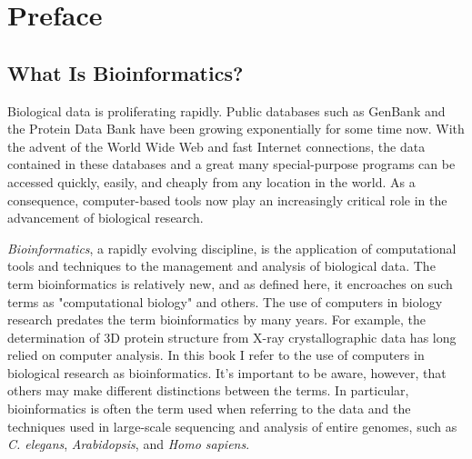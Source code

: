 \chapter*{Preface}
\minitoc %

\section*{What Is Bioinformatics?}
Biological data is proliferating rapidly. Public databases such as GenBank and the Protein Data Bank have been growing exponentially for some time now. With the advent of the World Wide Web and fast Internet connections, the data contained in these databases and a great many special-purpose programs can be accessed quickly, easily, and cheaply from any location in the world. As a consequence, computer-based tools now play an increasingly critical role in the advancement of biological research.

\textit{Bioinformatics}, a rapidly evolving discipline, is the application of computational tools and techniques to the management and analysis of biological data. The term bioinformatics is relatively new, and as defined here, it encroaches on such terms as "computational biology" and others. The use of computers in biology research predates the term bioinformatics by many years. For example, the determination of 3D protein structure from X-ray crystallographic data has long relied on computer analysis. In this book I refer to the use of computers in biological research as bioinformatics. It's important to be aware, however, that others may make different distinctions between the terms.  In particular, bioinformatics is often the term used when referring to the data and the techniques used in large-scale sequencing and analysis of entire genomes, such as \textit{C. elegans}, \textit{Arabidopsis}, and \textit{Homo sapiens}.

